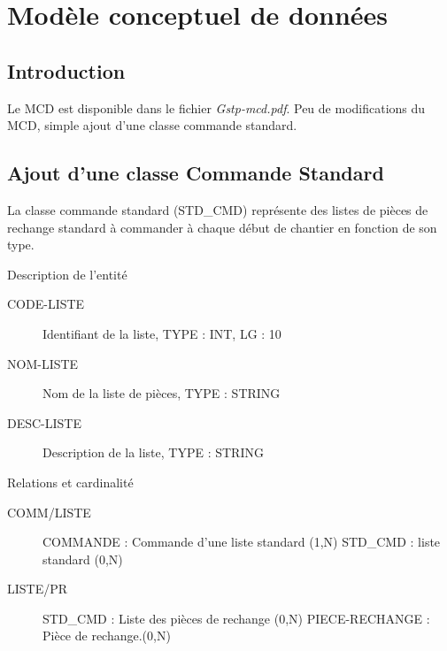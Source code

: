 \section{Modèle conceptuel de données}

\subsection{Introduction}
Le MCD est disponible dans le fichier {\sl Gstp-mcd.pdf}.
Peu de modifications du MCD, simple ajout d'une classe commande standard.


\subsection{Ajout d'une classe Commande Standard}

La classe commande standard (STD\_CMD) représente des listes de pièces de 
rechange standard à commander à chaque début de chantier en fonction de son type.

\par{Description de l'entité}
\begin{description}
    \item[CODE-LISTE] Identifiant de la liste, TYPE : INT, LG : 10
    \item[NOM-LISTE] Nom de la liste de pièces, TYPE : STRING
    \item[DESC-LISTE] Description de la liste, TYPE : STRING
\end{description}

\par{Relations et cardinalité}
\begin{description}
    \item[COMM/LISTE] COMMANDE : Commande d'une liste standard (1,N)\el
        STD\_CMD : liste standard (0,N)
    \item[LISTE/PR] STD\_CMD : Liste des pièces de rechange (0,N)\el
        PIECE-RECHANGE :  Pièce de rechange.(0,N)
\end{description}

